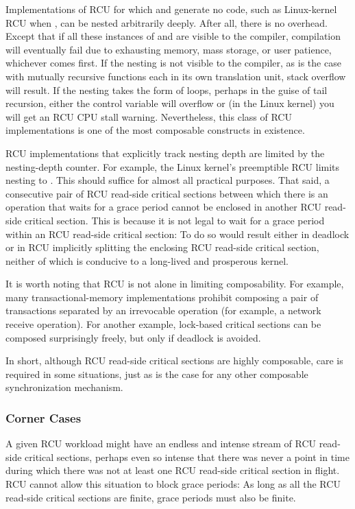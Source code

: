 Implementations of RCU for which  and
 generate no code, such as Linux-kernel RCU when
, can be nested arbitrarily deeply.
After all, there
is no overhead. Except that if all these instances of
 and  are visible to the
compiler, compilation will eventually fail due to exhausting memory,
mass storage, or user patience, whichever comes first.
If the nesting is
not visible to the compiler, as is the case with mutually recursive
functions each in its own translation unit, stack overflow will result.
If the nesting takes the form of loops, perhaps in the guise of tail
recursion, either the control variable will overflow or (in the Linux
kernel) you will get an RCU CPU stall warning. Nevertheless, this class
of RCU implementations is one of the most composable constructs in
existence.

RCU implementations that explicitly track nesting depth are limited by
the nesting-depth counter.
For example, the Linux kernel's preemptible
RCU limits nesting to . This should suffice for almost all
practical purposes.
That said, a consecutive pair of RCU read-side
critical sections between which there is an operation that waits for a
grace period cannot be enclosed in another RCU read-side critical
section.
This is because it is not legal to wait for a grace period
within an RCU read-side critical section:
To do so would result either
in deadlock or in RCU implicitly splitting the enclosing RCU read-side
critical section, neither of which is conducive to a long-lived and
prosperous kernel.

It is worth noting that RCU is not alone in limiting composability. For
example, many transactional-memory implementations prohibit composing a
pair of transactions separated by an irrevocable operation (for example,
a network receive operation).
For another example, lock-based critical
sections can be composed surprisingly freely, but only if deadlock is
avoided.

In short, although RCU read-side critical sections are highly
composable, care is required in some situations, just as is the case for
any other composable synchronization mechanism.


\subsubsection{Corner Cases}

A given RCU workload might have an endless and intense stream of RCU
read-side critical sections, perhaps even so intense that there was
never a point in time during which there was not at least one RCU
read-side critical section in flight.
RCU cannot allow this situation to
block grace periods: As long as all the RCU read-side critical sections
are finite, grace periods must also be finite.

